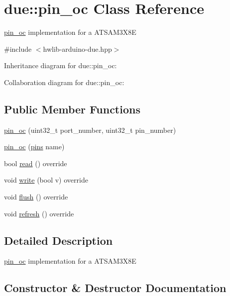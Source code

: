 \hypertarget{classdue_1_1pin__oc}{}\section{due\+:\+:pin\+\_\+oc Class Reference}
\label{classdue_1_1pin__oc}


\hyperlink{classdue_1_1pin__oc}{pin\+\_\+oc} implementation for a A\+T\+S\+A\+M3\+X8E  




{\ttfamily \#include $<$hwlib-\/arduino-\/due.\+hpp$>$}



Inheritance diagram for due\+:\+:pin\+\_\+oc\+:


Collaboration diagram for due\+:\+:pin\+\_\+oc\+:
\subsection*{Public Member Functions}
\begin{DoxyCompactItemize}
\item 
\hyperlink{classdue_1_1pin__oc_ac7b805c3e4492fa621850c8469af91b9}{pin\+\_\+oc} (uint32\+\_\+t port\+\_\+number, uint32\+\_\+t pin\+\_\+number)
\item 
\hyperlink{classdue_1_1pin__oc_a26daecda4236219f16e896cb82e9e6aa}{pin\+\_\+oc} (\hyperlink{namespacedue_a8ffa3ec309934ff9db34317e504bcc92}{pins} name)
\item 
bool \hyperlink{classdue_1_1pin__oc_a2b9121a384b5645253b799e54417c5ca}{read} () override
\item 
void \hyperlink{classdue_1_1pin__oc_ae79fc294d52d1d7c69117af5ffd81316}{write} (bool v) override
\item 
void \hyperlink{classdue_1_1pin__oc_a911e67dbcc0005b3eae0d511f576a215}{flush} () override
\item 
void \hyperlink{classdue_1_1pin__oc_a9cda433d0079aee45a282f07efe2fee3}{refresh} () override
\end{DoxyCompactItemize}


\subsection{Detailed Description}
\hyperlink{classdue_1_1pin__oc}{pin\+\_\+oc} implementation for a A\+T\+S\+A\+M3\+X8E 

\subsection{Constructor \& Destructor Documentation}
\mbox{\label{classdue_1_1pin__oc_ac7b805c3e4492fa621850c8469af91b9}} 
